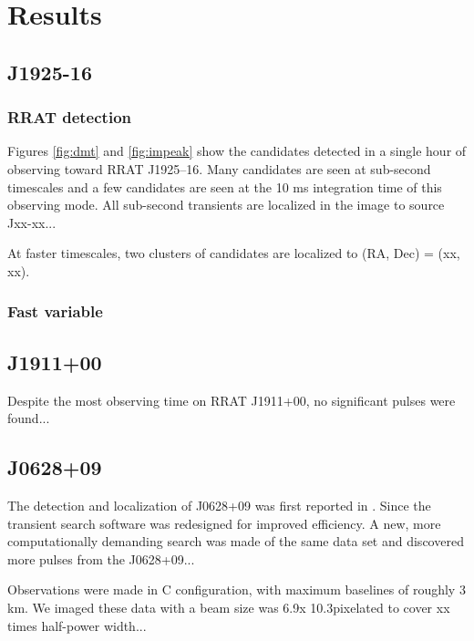 \section{Results}

\subsection{J1925-16}
\subsubsection{RRAT detection}
\label{rrat1925}

Figures \ref{fig:dmt} and \ref{fig:impeak} show the candidates detected in a single hour of observing toward RRAT J1925--16. Many candidates are seen at sub-second timescales and a few candidates are seen at the 10 ms integration time of this observing mode. All sub-second transients are localized in the image to source Jxx-xx...

At faster timescales, two clusters of candidates are localized to (RA, Dec) = (xx, xx). 

\subsubsection{Fast variable}
\label{fast}


\subsection{J1911+00}

Despite the most observing time on RRAT J1911+00, no significant pulses were found...

\subsection{J0628+09}

The detection and localization of J0628+09 was first reported in \cite{Law_2012}. Since the transient search software was redesigned for improved efficiency. A new, more computationally demanding search was made of the same data set and discovered more pulses from the J0628+09...

Observations were made in C configuration, with maximum baselines of roughly 3 km. We imaged these data with a beam size was 6.9\arcsec x 10.3\arcsec pixelated to cover xx times half-power width...
  
  
  